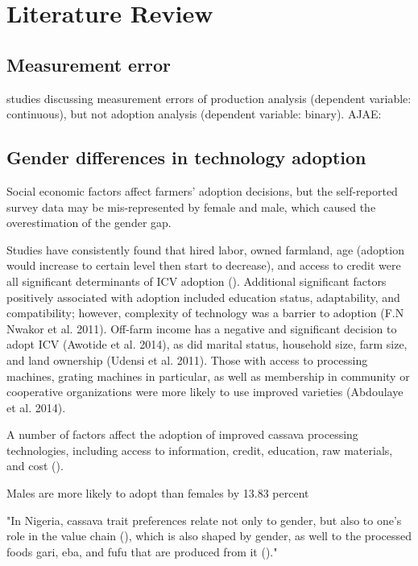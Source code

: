 \documentclass[12pt]{article}
\begin{document}
	\section{Literature Review} \label{sec:literature}
	\subsection{Measurement error}
	studies discussing measurement errors of production analysis (dependent variable: continuous), but not adoption analysis (dependent variable: binary). 
	\cite{abay2022inferential}
	AJAE:
	 \cite{abay2021measurement}
	 
	 \subsection{Gender differences in technology adoption}
	 
	 \cite{peterman2014review}
	 
	 
	 Social economic factors affect farmers' adoption decisions, but the self-reported survey data may be mis-represented by female and male, which caused the overestimation of the gender gap. 
	 
	 Studies have consistently found that hired labor, owned farmland, age (adoption would increase to certain level then start to decrease), and access to credit were all significant determinants of ICV adoption (\cite{awotide2014assessing}). Additional significant factors positively associated with adoption included education status, adaptability, and compatibility; however, complexity of technology was a barrier to adoption (F.N Nwakor et al. 2011). Off-farm income has a negative and significant decision to adopt ICV (Awotide et al. 2014), as did marital status, household size, farm size, and land ownership (Udensi et al. 2011). Those with access to processing machines, grating machines in particular, as well as membership in community or cooperative organizations were more likely to use improved varieties (Abdoulaye et al. 2014).
	 
	 
	 A number of factors affect the adoption of improved cassava processing technologies, including access to information, credit, education, raw materials, and cost (\cite{ehinmowo2016adoption}).
 
Males are more likely to adopt than females by 13.83 percent \cite{obisesan2014gender}


"In Nigeria, cassava trait preferences relate not only to gender, but also to one’s role in the value chain (\cite{teeken2018cassava}), which is also shaped by gender, as well to the processed foods gari, eba, and fufu that are produced from it (\cite{teeken2021understanding})."
\end{document}
